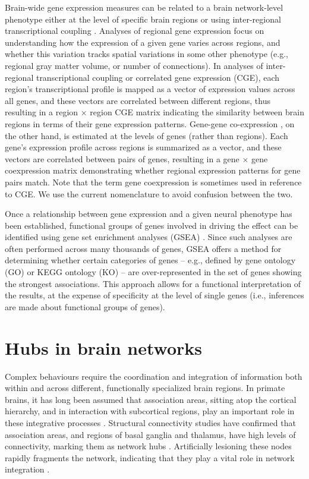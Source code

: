 Brain-wide gene expression measures can be related to a brain network-level phenotype either at the level of specific brain regions \citep{Myers2007,Rittman2016,Vertes2016b,Parkes2017} or using inter-regional transcriptional coupling \citep{Richiardi2015,Fulcher2016,Arnatkeviciute2018,Romero-Garcia2018}. Analyses of regional gene expression focus on understanding how the expression of a given gene varies across regions, and whether this variation tracks spatial variations in some other phenotype (e.g., regional gray matter volume, or number of connections). In analyses of inter-regional transcriptional coupling or correlated gene expression (CGE), each region’s transcriptional profile is mapped as a vector of expression values across all genes, and these vectors are correlated between different regions, thus resulting in a region $\times$ region CGE matrix indicating the similarity between brain regions in terms of their gene expression patterns. Gene-gene co-expression \citep{Eising2016,Keo2017,Negi2017}, on the other hand, is estimated at the levels of genes (rather than regions). Each gene’s expression profile across regions is summarized as a vector, and these vectors are correlated between pairs of genes, resulting in a gene $\times$ gene coexpression matrix demonstrating whether regional expression patterns for gene pairs match. Note that the term gene coexpression is sometimes used in reference to CGE. We use the current nomenclature to avoid confusion between the two.

Once a relationship between gene expression and a given neural phenotype has been established, functional groups of genes involved in driving the effect can be identified using gene set enrichment analyses (GSEA) \citep{Subramanian2005,Irizarry2009}.
Since such analyses are often performed across many thousands of genes, GSEA offers a method for determining whether certain categories of genes -- e.g., defined by gene ontology (GO) \citep{Ashburner2000} or KEGG ontology (KO) \citep{Kanehisa2000} -- are over-represented in the set of genes showing the strongest associations. This approach allows for a functional interpretation of the results, at the expense of specificity at the level of single genes (i.e., inferences are made about functional groups of genes).

\section{Hubs in brain networks}

Complex behaviours require the coordination and integration of information both within and across different, functionally specialized brain regions. In primate brains, it has long been assumed that association areas, sitting atop the cortical hierarchy, and in interaction with subcortical regions, play an important role in these integrative processes \citep{Felleman,Mesulam1998,Meyer2009a}.
Structural connectivity  studies have confirmed that association areas, and regions of basal ganglia and thalamus, have high levels of connectivity, marking them as network hubs \citep{VandenHeuvel2011}.
Artificially lesioning these nodes rapidly fragments the network, indicating that they play a vital role in network integration \citep{Albert2000,VandenHeuvel2011}.

